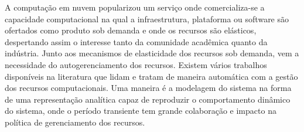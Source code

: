 

A computação em nuvem popularizou um serviço onde comercializa-se a capacidade computacional na qual a infraestrutura, plataforma ou software são ofertados como produto sob demanda e onde os recursos são elásticos, despertando assim o interesse tanto da comunidade acadêmica quanto da indústria.
Junto aos mecanismos de elasticidade dos recursos sob demanda, vem a necessidade do autogerenciamento dos recursos. Existem vários trabalhos disponíveis na literatura que lidam e tratam de maneira automática com a gestão dos recursos computacionais. Uma maneira é a modelagem do sistema na forma de uma representação analítica capaz de reproduzir o comportamento dinâmico do sistema, onde o período transiente tem grande colaboração e impacto na política de gerenciamento dos recursos.


